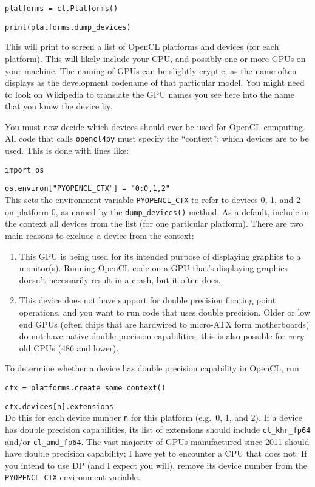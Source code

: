 \documentclass[12pt,pdftex,letterpaper]{article}
\begin{document}
\texttt{platforms = cl.Platforms()}

\texttt{print(platforms.dump\_devices)}

This will print to screen a list of OpenCL platforms and devices (for each platform).  This will likely include your CPU, and possibly one or more GPUs on your machine.  The naming of GPUs can be slightly cryptic, as the name often displays as the development codename of that particular model.  You might need to look on Wikipedia to translate the GPU names you see here into the name that you know the device by.

You must now decide which devices should ever be used for OpenCL computing.  All code that calls \texttt{opencl4py} must specify the ``context'': which devices are to be used.  This is done with lines like:

\texttt{import os}

\texttt{os.environ["PYOPENCL\_CTX"] = "0:0,1,2"}\\
This sets the environment variable \texttt{PYOPENCL\_CTX} to refer to devices 0, 1, and 2 on platform 0, as named by the \texttt{dump\_devices()} method.  As a default, include in the context all devices from the list (for one particular platform).  There are two main reasons to exclude a device from the context:
\begin{enumerate}
\item This GPU is being used for its intended purpose of displaying graphics to a monitor(s).  Running OpenCL code on a GPU that's displaying graphics doesn't necessarily result in a crash, but it often does.

\item This device does not have support for double precision floating point operations, and you want to run code that uses double precision.  Older or low end GPUs (often chips that are hardwired to micro-ATX form motherboards) do not have native double precision capabilities; this is also possible for \textit{very} old CPUs (486 and lower). 
\end{enumerate}
To determine whether a device has double precision capability in OpenCL, run:

\texttt{ctx = platforms.create\_some\_context()}

\texttt{ctx.devices[n].extensions}\\
Do this for each device number \texttt{n} for this platform (e.g.\ 0, 1, and 2).  If a device has double precision capabilities, its list of extensions should include \texttt{cl\_khr\_fp64} and/or \texttt{cl\_amd\_fp64}.  The vast majority of GPUs manufactured since 2011 should have double precision capability; I have yet to encounter a CPU that does not.  If you intend to use DP (and I expect you will), remove its device number from the \texttt{PYOPENCL\_CTX} environment variable.
\end{document}
